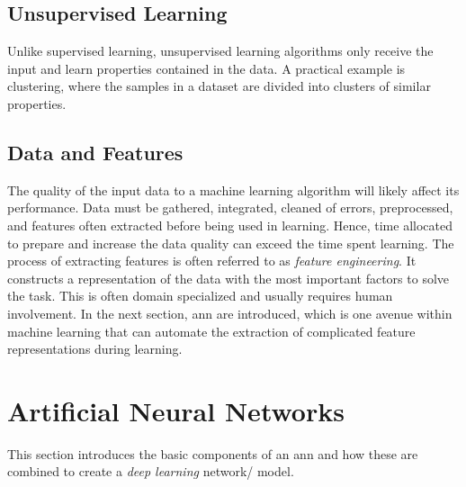         \subsection{Unsupervised Learning}
            Unlike supervised learning, unsupervised learning algorithms only receive the input and learn properties contained in the data\cite{Goodfellow-et-al-2016}. A practical example is clustering, where the samples in a dataset are divided into clusters of similar properties. 
    
    \subsection{Data and Features}
    The quality of the input data to a machine learning algorithm will likely affect its performance\cite{najafabadi2015deep}. Data must be gathered, integrated, cleaned of errors, preprocessed, and features often extracted before being used in learning. Hence, time allocated to prepare and increase the data quality can exceed the time spent learning. The process of extracting features is often referred to as \textit{feature engineering}. It constructs a representation of the data with the most important factors to solve the task. This is often domain specialized and usually requires human involvement. In the next section, \gls{ann} are introduced, which is one avenue within machine learning that can automate the extraction of complicated feature representations during learning.


\section{Artificial Neural Networks} \label{neural networks}
    This section introduces the basic components of an \gls{ann} and how these are combined to create a \textit{deep learning} network/ model. 

